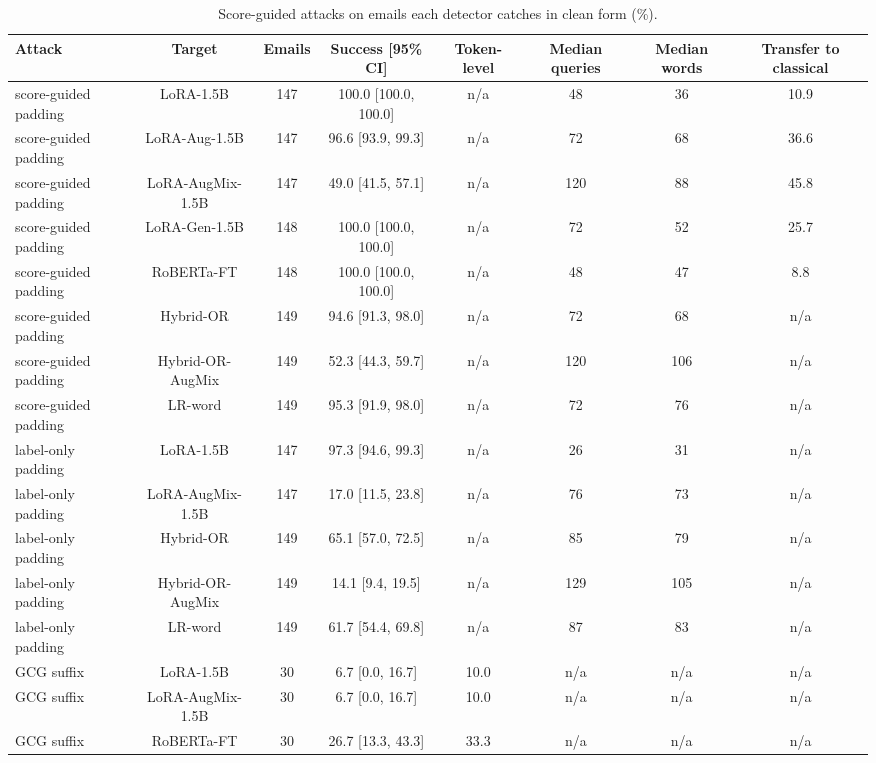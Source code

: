 \begin{table}[t]
\centering
\caption{Score-guided attacks on emails each detector catches in clean form (\%).}
\label{tab:scoreguided}
\footnotesize
\begin{tabular}{lccccccc}
\toprule
\textbf{Attack} & \textbf{Target} & \textbf{Emails} & \textbf{Success [95\% CI]} & \textbf{Token-level} & \textbf{Median queries} & \textbf{Median words} & \textbf{Transfer to classical} \\
\midrule
score-guided padding & LoRA-1.5B & 147 & 100.0 [100.0, 100.0] & n/a & 48 & 36 & 10.9 \\
score-guided padding & LoRA-Aug-1.5B & 147 & 96.6 [93.9, 99.3] & n/a & 72 & 68 & 36.6 \\
score-guided padding & LoRA-AugMix-1.5B & 147 & 49.0 [41.5, 57.1] & n/a & 120 & 88 & 45.8 \\
score-guided padding & LoRA-Gen-1.5B & 148 & 100.0 [100.0, 100.0] & n/a & 72 & 52 & 25.7 \\
score-guided padding & RoBERTa-FT & 148 & 100.0 [100.0, 100.0] & n/a & 48 & 47 & 8.8 \\
score-guided padding & Hybrid-OR & 149 & 94.6 [91.3, 98.0] & n/a & 72 & 68 & n/a \\
score-guided padding & Hybrid-OR-AugMix & 149 & 52.3 [44.3, 59.7] & n/a & 120 & 106 & n/a \\
score-guided padding & LR-word & 149 & 95.3 [91.9, 98.0] & n/a & 72 & 76 & n/a \\
label-only padding & LoRA-1.5B & 147 & 97.3 [94.6, 99.3] & n/a & 26 & 31 & n/a \\
label-only padding & LoRA-AugMix-1.5B & 147 & 17.0 [11.5, 23.8] & n/a & 76 & 73 & n/a \\
label-only padding & Hybrid-OR & 149 & 65.1 [57.0, 72.5] & n/a & 85 & 79 & n/a \\
label-only padding & Hybrid-OR-AugMix & 149 & 14.1 [9.4, 19.5] & n/a & 129 & 105 & n/a \\
label-only padding & LR-word & 149 & 61.7 [54.4, 69.8] & n/a & 87 & 83 & n/a \\
GCG suffix & LoRA-1.5B & 30 & 6.7 [0.0, 16.7] & 10.0 & n/a & n/a & n/a \\
GCG suffix & LoRA-AugMix-1.5B & 30 & 6.7 [0.0, 16.7] & 10.0 & n/a & n/a & n/a \\
GCG suffix & RoBERTa-FT & 30 & 26.7 [13.3, 43.3] & 33.3 & n/a & n/a & n/a \\
\bottomrule
\end{tabular}
\end{table}